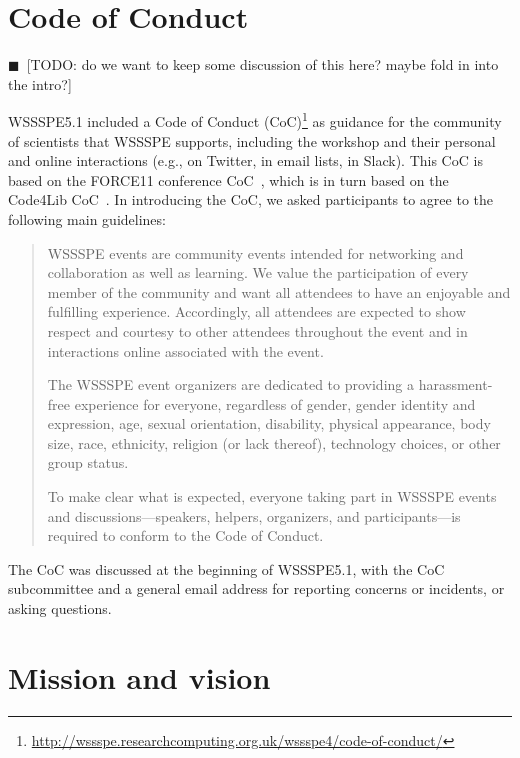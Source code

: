 \documentclass[11pt, oneside]{amsart}
\makeatletter
\newcommand\footnoteref[1]{\protected@xdef\@thefnmark{\ref{#1}}\@footnotemark}
\newcommand{\todo}[1]{{\color{blue}$\blacksquare$~\textsf{[TODO: #1]}}}
\makeatother
\begin{document}
\section{Code of Conduct}\label{sec:CoC}

\todo{do we want to keep some discussion of this here?  maybe fold in into the intro?}

WSSSPE5.1 included a Code of Conduct (CoC)\footnote{\label{footnote:CoC}\url{http://wssspe.researchcomputing.org.uk/wssspe4/code-of-conduct/}} as guidance for the community of scientists that WSSSPE
supports, including the workshop and their personal and online interactions (e.g., on
Twitter, in email lists, in Slack). This CoC is based on the
FORCE11 conference CoC~\cite{FORCE11:CoC}, which is in turn based on the Code4Lib
CoC~\cite{Code4Lib:CoC}.
In introducing the CoC, we asked participants to agree to the following main guidelines:
\begin{quote}
    WSSSPE events are community events intended for networking and collaboration
    as well as learning. We value the participation of every member of the
    community and want all attendees to have an enjoyable and fulfilling
    experience. Accordingly, all attendees are expected to show respect and
    courtesy to other attendees throughout the event and in interactions online
    associated with the event.

    The WSSSPE event organizers are dedicated to providing a harassment-free
    experience for everyone, regardless of gender, gender identity and
    expression, age, sexual orientation, disability, physical appearance,
    body size, race, ethnicity, religion (or lack thereof), technology choices,
    or other group status.

    To make clear what is expected, everyone taking part in WSSSPE events and
    discussions---speakers, helpers, organizers, and participants---is required
    to conform to the Code of Conduct\footnoteref{footnote:CoC}.

 \end{quote}

The CoC was discussed at the beginning of WSSSPE5.1, with the CoC subcommittee
and a general email address for reporting concerns or incidents, or
asking questions.

\section{Mission and vision}\label{sec:mission}
\end{document}

